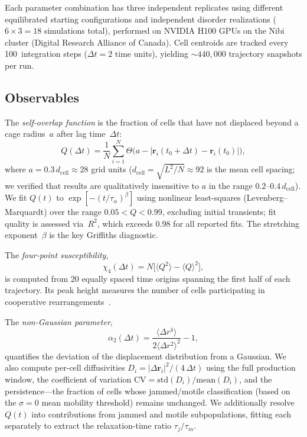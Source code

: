 \documentclass[aps,pre,twocolumn,superscriptaddress,longbibliography,floatfix]{revtex4-2}
\begin{document}
Each parameter combination has three independent replicates using
different equilibrated starting configurations and independent disorder
realizations ($6\times 3 = 18$ simulations total), performed on NVIDIA
H100 GPUs on the Nibi cluster (Digital Research Alliance of Canada).
Cell centroids are tracked every 100~integration steps ($\Delta t = 2$
time units), yielding $\sim\!440{,}000$ trajectory snapshots per run.

\subsection{Observables}

The \emph{self-overlap function} is the fraction of cells that have not
displaced beyond a cage radius~$a$ after lag time~$\Delta t$:
\begin{equation}
  Q(\Delta t) = \frac{1}{N}\sum_{i=1}^{N}
  \Theta\!\bigl(a - |\mathbf{r}_i(t_0\!+\!\Delta t)
  - \mathbf{r}_i(t_0)|\bigr),
\label{eq:Qt}
\end{equation}
where $a = 0.3\,d_{\mathrm{cell}}\!\approx\!28$ grid units
($d_{\mathrm{cell}} = \sqrt{L^2/N}\!\approx\!92$ is the mean cell spacing;  we
verified that results are qualitatively insensitive to $a$ in the
range $0.2$--$0.4\,d_{\mathrm{cell}}$).  We fit
$Q(t)$ to $\exp[-(t/\tau_\alpha)^\beta]$ using nonlinear
least-squares (Levenberg--Marquardt) over the range
$0.05 < Q < 0.99$, excluding initial transients; fit quality is
assessed via~$R^2$, which exceeds $0.98$ for all reported fits.
The stretching exponent~$\beta$ is the key Griffiths diagnostic.

The \emph{four-point susceptibility},
\begin{equation}
  \chi_4(\Delta t) = N\bigl[\langle Q^2\rangle
  - \langle Q\rangle^2\bigr],
\label{eq:chi4}
\end{equation}
is computed from 20 equally spaced time origins spanning the first half
of each trajectory.  Its peak height measures the number of cells
participating in cooperative rearrangements~\cite{berthier2011}.

The \emph{non-Gaussian parameter},
\begin{equation}
  \alpha_2(\Delta t) = \frac{\langle\Delta r^4\rangle}
  {2\langle\Delta r^2\rangle^2} - 1,
\label{eq:alpha2}
\end{equation}
quantifies the deviation of the displacement distribution from a
Gaussian.  We also compute per-cell diffusivities
$D_i = |\Delta\mathbf{r}_i|^2/(4\,\Delta t)$ using the full production
window, the coefficient of variation
$\mathrm{CV} = \mathrm{std}(D_i)/\mathrm{mean}(D_i)$, and the
persistence---the fraction of cells whose jammed/motile classification
(based on the $\sigma\!=\!0$ mean mobility threshold) remains
unchanged.  We additionally resolve $Q(t)$ into contributions from
jammed and motile subpopulations, fitting each separately to extract
the relaxation-time ratio $\tau_j/\tau_m$.
\end{document}
